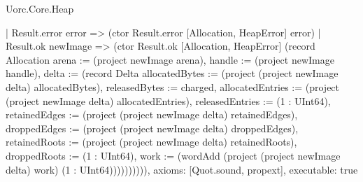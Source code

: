 \begin{lexlean}{Uorc.Core.Heap}
\begin{semanticmodule}
{            | Result.error error => (ctor Result.error [Allocation, HeapError] error)
            | Result.ok newImage => (ctor Result.ok [Allocation, HeapError] (record Allocation {arena := (project newImage arena), handle := (project newImage handle), delta := (record Delta {allocatedBytes := (project (project newImage delta) allocatedBytes), releasedBytes := charged, allocatedEntries := (project (project newImage delta) allocatedEntries), releasedEntries := (1 : UInt64), retainedEdges := (project (project newImage delta) retainedEdges), droppedEdges := (project (project newImage delta) droppedEdges), retainedRoots := (project (project newImage delta) retainedRoots), droppedRoots := (1 : UInt64), work := (wordAdd (project (project newImage delta) work) (1 : UInt64))})}))))))),
  axioms: [Quot.sound, propext],
  executable: true
}
\end{semanticmodule}
\end{lexlean}
